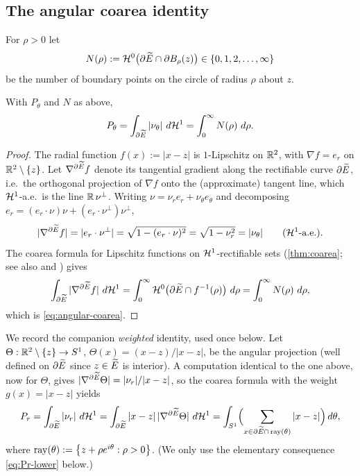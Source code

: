 \subsection{The angular coarea identity}

For $\rho>0$ let
\begin{equation}\label{eq:Ndef}
   N(\rho):=\mathcal{H}^0\bigl(\partial\widetilde{E}\cap\partial B_\rho(z)\bigr)
   \in\left\{0,1,2,\dots,\infty\right\}
\end{equation}
be the number of boundary points on the circle of radius $\rho$ about $z$.

\begin{lemma}\label{lem:angular-coarea}
With $P_\theta$ and $N$ as above,
\begin{equation}\label{eq:angular-coarea}
   P_\theta=\int_{\partial\widetilde{E}}|\nu_\theta|\,\,d\mathcal{H}^1
   =\int_0^\infty N(\rho)\,\,d\rho .
\end{equation}
\end{lemma}

\begin{proof}
The radial function $f(x):=|x-z|$ is $1$-Lipschitz on $\mathbb{R}^2$, with
$\nabla f=e_r$ on $\mathbb{R}^2\setminus\left\{z\right\}$. Let $\nabla^{\partial\widetilde{E}}f$ denote
its tangential gradient along the rectifiable curve $\partial\widetilde{E}$, i.e.\
the orthogonal projection of $\nabla f$ onto the (approximate) tangent line,
which $\mathcal{H}^1$-a.e.\ is the line $\mathbb{R}\,\nu^\perp$. Writing $\nu=\nu_r e_r
+\nu_\theta e_\theta$ and decomposing $e_r=(e_r\cdot\nu)\nu+(e_r\cdot
\nu^\perp)\nu^\perp$,
\[
   |\nabla^{\partial\widetilde{E}}f|=|e_r\cdot\nu^\perp|
   =\sqrt{1-(e_r\cdot\nu)^2}=\sqrt{1-\nu_r^2}=|\nu_\theta|
   \qquad(\mathcal{H}^1\text{-a.e.}).
\]
The coarea formula for Lipschitz functions on $\mathcal{H}^1$-rectifiable sets
\textup{(}\cref{thm:coarea}; see also \cite[Theorem~2.93]{AFP2000} and
\cite[\S3.4.2]{EvansGariepy2015}\textup{)} gives
\[
   \int_{\partial\widetilde{E}}|\nabla^{\partial\widetilde{E}}f|\,\,d\mathcal{H}^1
   =\int_0^\infty\mathcal{H}^0\bigl(\partial\widetilde{E}\cap f^{-1}(\rho)\bigr)\,\,d\rho
   =\int_0^\infty N(\rho)\,\,d\rho,
\]
which is \eqref{eq:angular-coarea}.
\end{proof}

We record the companion \emph{weighted} identity, used once below. Let
$\Theta:\mathbb{R}^2\setminus\left\{z\right\}\to S^1$, $\Theta(x)=(x-z)/|x-z|$, be the angular
projection (well defined on $\partial\widetilde{E}$ since $z\in\widetilde{E}$ is interior).
A computation identical to the one above, now for $\Theta$, gives
$|\nabla^{\partial\widetilde{E}}\Theta|=|\nu_r|/|x-z|$, so the coarea formula with
the weight $g(x)=|x-z|$ yields
\begin{equation}\label{eq:radial-weighted}
   P_r=\int_{\partial\widetilde{E}}|\nu_r|\,\,d\mathcal{H}^1
     =\int_{\partial\widetilde{E}}|x-z|\,|\nabla^{\partial\widetilde{E}}\Theta|\,\,d\mathcal{H}^1
     =\int_{S^1}\Bigl(\sum_{x\in\partial\widetilde{E}\cap\,\mathrm{ray}(\theta)}|x-z|\Bigr)\,d\theta,
\end{equation}
where $\mathrm{ray}(\theta):=\left\{z+\rho e^{i\theta}:\rho>0\right\}$. (We only use
the elementary consequence \eqref{eq:Pr-lower} below.)

